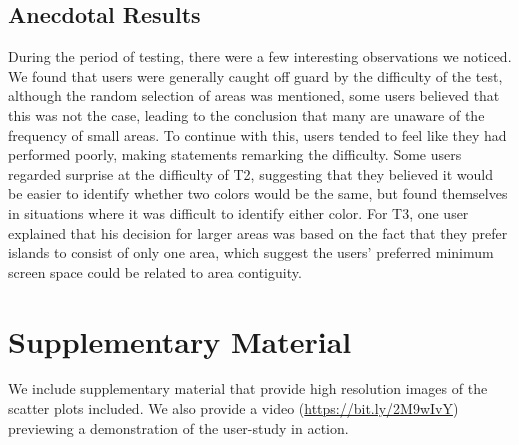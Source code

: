 \subsection{Anecdotal Results}
During the period of testing, there were a few interesting observations we noticed. We found that users were generally caught off guard by the difficulty of the test, although the random selection of areas was mentioned, some users believed that this was not the case, leading to the conclusion that many are unaware of the frequency of small areas. To continue with this, users tended to feel like they had performed poorly, making statements remarking the difficulty. Some users regarded surprise at the difficulty of T2, suggesting that they believed it would be easier to identify whether two colors would be the same, but found themselves in situations where it was difficult to identify either color. For T3, one user explained that his decision for larger areas was based on the fact that they prefer islands to consist of only one area, which suggest the users' preferred minimum screen space could be related to area contiguity.

\section{Supplementary Material}
We include supplementary material that provide high resolution images of the scatter plots included. We also provide a video (\url{https://bit.ly/2M9wIvY}) previewing a demonstration of the user-study in action.


